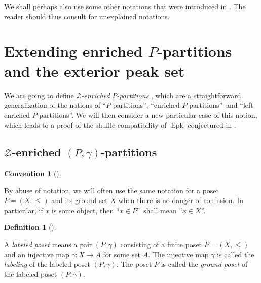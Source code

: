 \documentclass[numbers=enddot,12pt,final,onecolumn,notitlepage]{scrartcl}%
\theoremstyle{definition}
\newtheorem{defi}[theo]{Definition}
\newenvironment{definition}[1][]
{\begin{defi}[#1]\begin{leftbar}}
{\end{leftbar}\end{defi}}
\newtheorem{conv}[theo]{Convention}
\newenvironment{convention}[1][]
{\begin{conv}[#1]\begin{leftbar}}
{\end{leftbar}\end{conv}}
\newenvironment{convention}[1][Convention]{\noindent\textbf{#1.} }{\ \rule{0.5em}{0.5em}}
\begin{document}
We shall perhaps also use some other notations that were introduced in
\cite{part1}. The reader should thus consult \cite{part1} for unexplained notations.

\section{Extending enriched $P$-partitions and the exterior peak set}

We are going to define \textit{$\mathcal{Z}$-enriched }$P$\textit{-partitions}%
, which are a straightforward generalization of the notions of
\textquotedblleft$P$-partitions\textquotedblright, \textquotedblleft enriched
$P$-partitions\textquotedblright\ and \textquotedblleft left enriched
$P$-partitions\textquotedblright. We will then consider a new particular case
of this notion, which leads to a proof of the shuffle-compatibility of
$\operatorname*{Epk}$ conjectured in \cite{part1}.

\subsection{\label{subsect.Zenri.gen}$\mathcal{Z}$-enriched $\left(
P,\gamma\right)  $-partitions}

\begin{convention}
By abuse of notation, we will often use the same notation for a poset
$P=\left(  X,\leq\right)  $ and its ground set $X$ when there is no danger of
confusion. In particular, if $x$ is some object, then \textquotedblleft$x\in
P$\textquotedblright\ shall mean \textquotedblleft$x\in X$\textquotedblright.
\end{convention}

\begin{definition}
A \textit{labeled poset} means a pair $\left(  P,\gamma\right)  $ consisting
of a finite poset $P=\left(  X,\leq\right)  $ and an injective map
$\gamma:X\rightarrow A$ for some set $A$. The injective map $\gamma$ is called
the \textit{labeling} of the labeled poset $\left(  P,\gamma\right)  $. The
poset $P$ is called the \textit{ground poset} of the labeled poset $\left(
P,\gamma\right)  $.
\end{definition}
\end{document}
